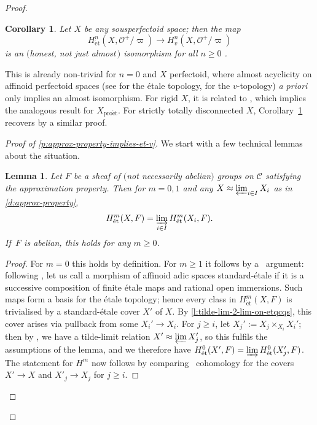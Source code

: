 \documentclass[11pt]{amsart}
\numberwithin{equation}{section}
\newtheorem{Lemma}[thm]{Lemma}
\newtheorem{Corollary}[thm]{Corollary}
\theoremstyle{definition}
\theoremstyle{remark}
\newcommand{\lra}{\longrightarrow}
\renewcommand{\O}{\mathcal{O}}
\newcommand{\et}{{\operatorname{\acute{e}t}}}
\newcommand{\proet}{{\operatorname{pro\acute{e}t}}}
\newcommand{\cH}{{\ifmmode \check{H}\else{\v{C}ech}\fi}}
\begin{document}
\begin{proof}
        \begin{Corollary}\label{cor215}
	  Let $X$ be any sousperfectoid space; then the map
          \[H^n_{\et}(X,\O^+/\varpi)\lra H^n_{v}(X,\O^+/\varpi)\]
		is an $($honest, not just almost\,$)$ isomorphism for all $n\geq 0$ .
	\end{Corollary}

        This is already non-trivial for $n=0$ and $X$ perfectoid, where almost acyclicity on affinoid perfectoid spaces (see \cite[Proposition 7.13]{perfectoid-spaces} for the \'etale topology, \cite[Proposition 8.8]{etale-cohomology-of-diamonds} for the $v$-topology) \textit{a priori} only implies an almost isomorphism. For rigid $X$, it is related to \cite[Lemma 4.2]{Scholze_p-adicHodgeForRigid}, which implies the analogous result for $X_{\proet}$. For strictly totally disconnected $X$, Corollary~\ref{cor215} recovers \cite[Proposition 2.13]{MannWerner_LocSys_p-adVB} by a similar proof.

	\begin{proof}[Proof of \cref{p:approx-property-implies-et-v}]
		We start with a few technical lemmas about the situation. 

	        \begin{Lemma}\label{l:approx-prop-and-cohom}
			Let $F$ be a sheaf of $($not necessarily abelian$)$ groups on $\mathcal C$ satisfying the approximation property. Then for $m=0,1$ and any $X\approx \varprojlim_{i\in I} X_i$ as in \cref{d:approx-property},
			\[H^m_{\et}(X,F)=\varinjlim_{i\in I} H^m_{\et}(X_i,F).\]
			If\, $F$ is abelian, this holds for any $m\geq 0$.
		\end{Lemma}

                \begin{proof}
			For $m=0$ this holds by definition. For $m\geq 1$ it follows by a \cH\ argument: following \cite[Definition 3.6]{heuer-diamantine-Picard}, let us call a morphism of affinoid adic spaces standard-\'etale if it is a successive composition of finite \'etale maps and rational open immersions. Such maps form a basis for the \'etale topology; hence every class in $H^m_{\et}(X,F)$ is trivialised by a standard-\'etale cover $X'$ of $X$. By \cref{l:tilde-lim-2-lim-on-etqcqs}, this cover arises via pullback from some $X_i'\to X_i$. For $j\geq i$, let $X_j':=X_j\times_{X_i}X_i'$; then by 
			\cite[Lemma~3.13]{heuer-diamantine-Picard}, we have a tilde-limit relation $X'\approx \varprojlim X_j'$, so this fulfils the assumptions of the lemma, and we therefore have $H^0_{\et}(X',F)=\varinjlim H^0_{\et}(X'_j,F)$. The statement for $H^m$ now follows by comparing \cH\ cohomology for the covers $X'\to X$ and $X'_j\to X_j$ for $j\geq i$.
		\end{proof}


\end{proof}
\end{proof}
\end{document}
